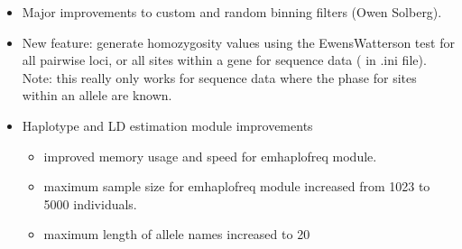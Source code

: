 \documentclass[letterpaper,10pt,english,openany,oneside]{sphinxmanual}
\begin{document}
\begin{itemize}
\item {} 
\sphinxAtStartPar
Major improvements to custom and random binning filters (Owen Solberg).

\item {} 
\sphinxAtStartPar
New feature: generate homozygosity values using the Ewens\sphinxhyphen{}Watterson test for
all pairwise loci, or all sites within a gene for sequence data
(\sphinxcode{\sphinxupquote{{[}homozygosityEWSlatkinExactPairwise{]}}} in .ini file).  Note: this
really only works for sequence data where the phase for sites
within an allele are known.

\item {} 
\sphinxAtStartPar
Haplotype and LD estimation module  improvements
\begin{itemize}
\item {} 
\sphinxAtStartPar
improved memory usage and speed for emhaplofreq module.

\item {} 
\sphinxAtStartPar
maximum sample size for emhaplofreq module increased from 1023 to
5000 individuals.

\item {} 
\sphinxAtStartPar
maximum length of allele names increased to 20

\end{itemize}

\end{itemize}
\end{document}

